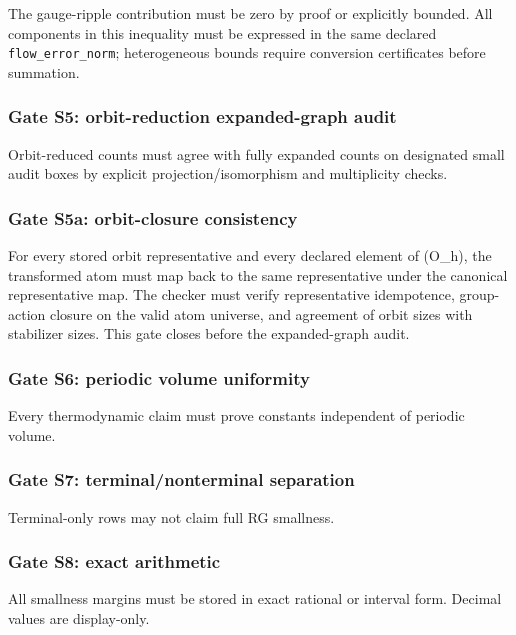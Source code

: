 \documentclass[
]{article}
\begin{document}
The gauge-ripple contribution must be zero by proof or explicitly
bounded. All components in this inequality must be expressed in the same
declared \texttt{flow\_error\_norm}; heterogeneous bounds require
conversion certificates before summation.

\subsubsection{Gate S5: orbit-reduction expanded-graph
audit}\label{gate-s5-orbit-reduction-expanded-graph-audit}

Orbit-reduced counts must agree with fully expanded counts on designated
small audit boxes by explicit projection/isomorphism and multiplicity
checks.

\subsubsection{Gate S5a: orbit-closure
consistency}\label{gate-s5a-orbit-closure-consistency}

For every stored orbit representative and every declared element of
(O\_h), the transformed atom must map back to the same representative
under the canonical representative map. The checker must verify
representative idempotence, group-action closure on the valid atom
universe, and agreement of orbit sizes with stabilizer sizes. This gate
closes before the expanded-graph audit.

\subsubsection{Gate S6: periodic volume
uniformity}\label{gate-s6-periodic-volume-uniformity}

Every thermodynamic claim must prove constants independent of periodic
volume.

\subsubsection{Gate S7: terminal/nonterminal
separation}\label{gate-s7-terminalnonterminal-separation}

Terminal-only rows may not claim full RG smallness.

\subsubsection{Gate S8: exact
arithmetic}\label{gate-s8-exact-arithmetic}

All smallness margins must be stored in exact rational or interval form.
Decimal values are display-only.
\end{document}
